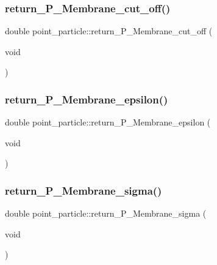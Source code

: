 \subsubsection{\texorpdfstring{return\_P\_Membrane\_cut\_off()}{return\_P\_Membrane\_cut\_off()}}
{\footnotesize\ttfamily double point\+\_\+particle\+::return\+\_\+\+P\+\_\+\+Membrane\+\_\+cut\+\_\+off (\begin{DoxyParamCaption}\item[{void}]{ }\end{DoxyParamCaption})\hspace{0.3cm}{\ttfamily [inline]}}

\mbox{\label{classpoint__particle_ac2e3983a015b533b30209283a3692cc1}} 
\subsubsection{\texorpdfstring{return\_P\_Membrane\_epsilon()}{return\_P\_Membrane\_epsilon()}}
{\footnotesize\ttfamily double point\+\_\+particle\+::return\+\_\+\+P\+\_\+\+Membrane\+\_\+epsilon (\begin{DoxyParamCaption}\item[{void}]{ }\end{DoxyParamCaption})\hspace{0.3cm}{\ttfamily [inline]}}

\mbox{\label{classpoint__particle_a51f76ba04a942622d54fb4e5388518a6}} 
\subsubsection{\texorpdfstring{return\_P\_Membrane\_sigma()}{return\_P\_Membrane\_sigma()}}
{\footnotesize\ttfamily double point\+\_\+particle\+::return\+\_\+\+P\+\_\+\+Membrane\+\_\+sigma (\begin{DoxyParamCaption}\item[{void}]{ }\end{DoxyParamCaption})\hspace{0.3cm}{\ttfamily [inline]}}

